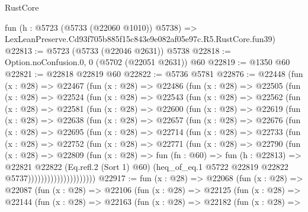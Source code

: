 \begin{lexlean}{RustCore}
\begin{coremodule}
    fun (h : @5723 (@5733 (@22060 @1010)) @5738) =>
    LexLeanPreserve.Cd93f705b885f15c843e9e082af05e97c.R5.RustCore.fun39)
@22813 := @5723 (@5733 (@22046 @2631)) @5738
@22818 := Option.noConfusion.{0, 0} (@5702 (@22051 @2631)) @60
@22819 := @1350 @60
@22821 := @22818 @22819 @60
@22822 := @5736 @5781
@22876 := @22448
    (fun (x : @28) =>
    @22467
      (fun (x : @28) =>
      @22486
        (fun (x : @28) =>
        @22505
          (fun (x : @28) =>
          @22524
            (fun (x : @28) =>
            @22543
              (fun (x : @28) =>
              @22562
                (fun (x : @28) =>
                @22581
                  (fun (x : @28) =>
                  @22600
                    (fun (x : @28) =>
                    @22619
                      (fun (x : @28) =>
                      @22638
                        (fun (x : @28) =>
                        @22657
                          (fun (x : @28) =>
                          @22676
                            (fun (x : @28) =>
                            @22695
                              (fun (x : @28) =>
                              @22714
                                (fun (x : @28) =>
                                @22733
                                  (fun (x : @28) =>
                                  @22752
                                    (fun (x : @28) =>
                                    @22771
                                      (fun (x : @28) =>
                                      @22790
                                        (fun (x : @28) =>
                                        @22809
                                          (fun (x : @28) =>
                                          fun (fn : @60) =>
                                          fun (h : @22813) =>
                                          @22821
                                            @22822
                                            (Eq.refl.{2} (Sort 1) @60)
                                            (heq_of_eq.{1}
                                              @5722
                                              @22819
                                              @22822
                                              @5737)))))))))))))))))))))
@22917 := fun (x : @28) =>
  @22068
    (fun (x : @28) =>
    @22087
      (fun (x : @28) =>
      @22106
        (fun (x : @28) =>
        @22125
          (fun (x : @28) =>
          @22144
            (fun (x : @28) =>
            @22163
              (fun (x : @28) =>
              @22182
                (fun (x : @28) =>

\end{coremodule}
\end{lexlean}

